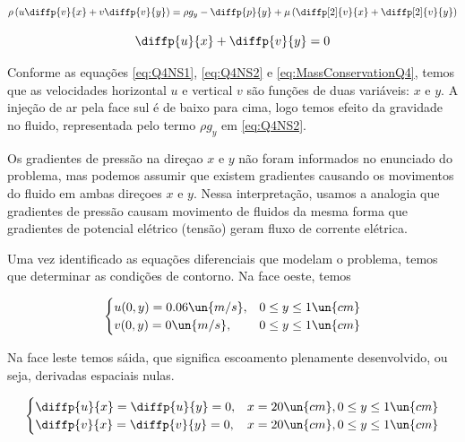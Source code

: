 \begin{equation}\label{eq:Q4NS2}
        \rho\left(u\diffp{v}{x} + v\diffp{v}{y}\right)
         = \rho g_y - \diffp{p}{y} + \mu \left(\diffp[2]{v}{x} + \diffp[2]{v}{y}\right)
\end{equation}

\begin{equation}\label{eq:MassConservationQ4}
    \diffp{u}{x} + \diffp{v}{y} = 0
\end{equation}

Conforme as equações \eqref{eq:Q4NS1}, \eqref{eq:Q4NS2} e \eqref{eq:MassConservationQ4},
temos que as velocidades horizontal $u$ e vertical $v$ são funções de duas variáveis: $x$ e $y$.
A injeção de ar pela face sul é de baixo para cima, logo temos efeito da gravidade no fluido,
representada pelo termo $\rho g_y$ em \eqref{eq:Q4NS2}. 

Os gradientes de pressão na direçao $x$ e $y$
não foram informados no enunciado do problema, mas podemos assumir que existem gradientes 
causando os movimentos do fluido em ambas direçoes $x$ e $y$. Nessa interpretação, usamos a analogia
que gradientes de pressão causam movimento de fluidos da mesma forma que gradientes de potencial
elétrico (tensão) geram fluxo de corrente elétrica. 

Uma vez identificado as equações diferenciais que modelam o problema, temos que determinar
as condições de contorno. Na face oeste, temos

\begin{equation}\label{eq:q4WestBoundary}
    \begin{cases}
        u(0, y) = 0.06 \un{m/s}, & 0 \leq y \leq 1 \un{cm} \\
        v(0, y) = 0 \un{m/s}, & 0 \leq y \leq 1 \un{cm} \\
    \end{cases}
\end{equation}

Na face leste temos sáida, que significa escoamento plenamente
desenvolvido, ou seja, derivadas espaciais nulas.

\begin{equation}\label{eq:q4EastBoundary}
    \begin{cases}
        \diffp{u}{x} = \diffp{u}{y} = 0, & x = 20 \un{cm}, 0 \leq y \leq 1 \un{cm}  \\
        \diffp{v}{x} = \diffp{v}{y} = 0, & x = 20 \un{cm}, 0 \leq y \leq 1 \un{cm} \\
    \end{cases}
\end{equation}

